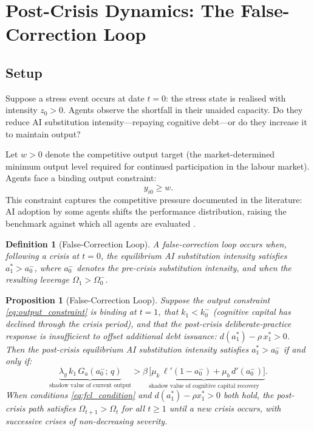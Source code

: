 \documentclass[12pt]{article}
\newtheorem{proposition}{Proposition}
\newtheorem{definition}{Definition}
\begin{document}
\section{Post-Crisis Dynamics: The False-Correction Loop}
\label{sec:fcl}

\subsection{Setup}

Suppose a stress event occurs at date $t=0$: the stress state is realised with
intensity $z_0 > 0$. Agents observe the shortfall in their unaided capacity.
Do they reduce AI substitution intensity---repaying cognitive debt---or do they
increase it to maintain output?

Let $w > 0$ denote the competitive output target (the market-determined
minimum output level required for continued participation in the labour market).
Agents face a binding output constraint:
\begin{equation}
y_{i0} \geq w. \label{eq:output_constraint}
\end{equation}
This constraint captures the competitive pressure documented in the literature:
AI adoption by some agents shifts the performance distribution, raising the
benchmark against which all agents are evaluated \citep{BrynjolfssonEtAl2025}.

\begin{definition}[False-Correction Loop]
A \emph{false-correction loop} occurs when, following a crisis at $t=0$,
the equilibrium AI substitution intensity satisfies $a_{1}^* > a_{0}^-$,
where $a_0^-$ denotes the pre-crisis substitution intensity, and when the
resulting leverage $\Omega_1 > \Omega_{0}^-$.
\end{definition}

\begin{proposition}[False-Correction Loop]
\label{prop:fcl}
Suppose the output constraint \eqref{eq:output_constraint} is binding at $t=1$,
that $k_{1} < k_{0}^-$ (cognitive capital has declined through the crisis period),
and that the post-crisis deliberate-practice response is insufficient to offset
additional debt issuance: $d(a_1^*) - \rho\, x_1^* > 0$.
Then the post-crisis equilibrium AI substitution intensity satisfies
$a_1^* > a_0^-$ if and only if:
\begin{equation}
\underbrace{\lambda_y\, k_1\, G_a(a_0^-;\, q)}_{\text{shadow value of current output}}
> \underbrace{\beta\,\bigl[\mu_k\,\ell'(1-a_0^-) + \mu_b\,d'(a_0^-)\bigr]}_{\text{shadow value of cognitive capital recovery}}.
\label{eq:fcl_condition}
\end{equation}
When conditions \eqref{eq:fcl_condition} and $d(a_1^*) - \rho x_1^* > 0$ both
hold, the post-crisis path satisfies $\Omega_{t+1} > \Omega_t$ for all $t \geq 1$
until a new crisis occurs, with successive crises of non-decreasing severity.
\end{proposition}
\end{document}
